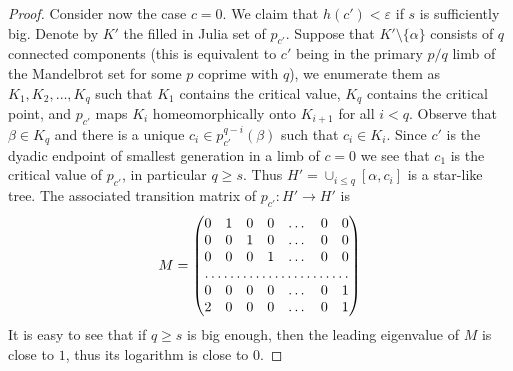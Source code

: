 \documentclass[12pt]{amsart}
\newcommand{\0}{\texttt{0}}
\newcommand{\1}{\texttt{1}}
\theoremstyle{definition}
\numberwithin{equation}{section}
\begin{document}
\begin{proof}
Consider now the case $c=0$. We claim that $h(c')<\varepsilon$ if $s$ is sufficiently big. Denote by $K'$ the filled in Julia set of $p_{c'}$. Suppose that $K'\setminus \{\alpha\}$ consists of $q$ connected components (this is equivalent to $c'$ being in the primary $p/q$ limb of the Mandelbrot set for some $p$ coprime with $q$), we enumerate them as $K_1,K_2,\dots ,K_{q}$ such that $K_1$ contains the critical value, $K_q$ contains the critical point, and $p_{c'}$ maps $K_i$ homeomorphically onto $K_{i+1}$ for all $i<q$. Observe that $\beta\in K_q$ and there is a unique $c_i\in p_{c'}^{q-i}(\beta)$ such that $c_i\in K_i$. Since $c'$ is the dyadic endpoint of smallest generation in a limb of $c=0$ we see that $c_1$ is the critical value of $p_{c'}$, in particular $q\ge s$. Thus $H'=\cup _{i\le q} [\alpha, c_i]$ is a star-like tree. The associated transition matrix of $p_{c'}\colon H'\to H'$ is 
\[M=\left(\begin{matrix}
    0      & 1 & 0 &0 & \dots &0 &0 \\
    0       & 0 & 1&0 & \dots &0 & 0 \\
    0       & 0 & 0&1 & \dots &0 & 0 \\
    \hdotsfor{7} \\
   0      & 0& 0 &0 & \dots & 0 &1\\
   2      & 0& 0 &0 & \dots & 0 &1
\end{matrix} \right)\]
It is easy to see that if $q\ge s$ is big enough, then the leading eigenvalue of $M$ is close to $1$, thus its logarithm is close to $0$.  
\end{proof}

\end{document}
